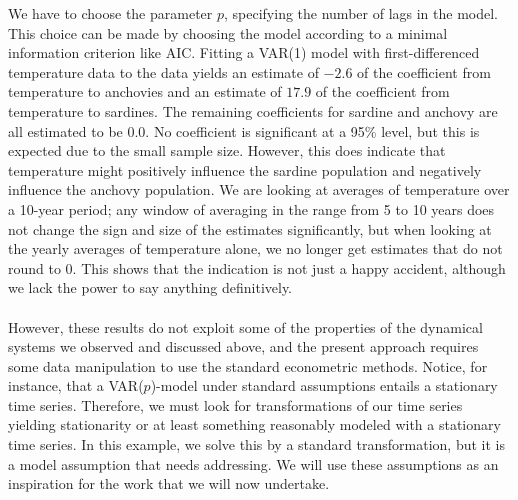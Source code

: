 \documentclass[11pt, a4paper]{memoir}
\theoremstyle{break}
\theoremstyle{break}
\theoremstyle{nonumberplain}
\begin{document}
We have to choose the parameter $p$, specifying the number of lags in the model. This choice can be made by choosing the model according to a minimal information criterion like AIC. Fitting a VAR(1) model with first-differenced temperature data to the data yields an estimate of $-2.6$ of the coefficient from temperature to anchovies and an estimate of $17.9$ of the coefficient from temperature to sardines. The remaining coefficients for sardine and anchovy are all estimated to be $0.0$. No coefficient is significant at a 95\% level, but this is expected due to the small sample size. However, this does indicate that temperature might positively influence the sardine population and negatively influence the anchovy population. We are looking at averages of temperature over a 10-year period; any window of averaging in the range from 5 to 10 years does not change the sign and size of the estimates significantly, but when looking at the yearly averages of temperature alone, we no longer get estimates that do not round to 0. This shows that the indication is not just a happy accident, although we lack the power to say anything definitively.\\\\ 
However, these results do not exploit some of the properties of the dynamical systems we observed and discussed above, and the present approach requires some data manipulation to use the standard econometric methods. Notice, for instance, that a VAR($p$)-model under standard assumptions entails a stationary time series. Therefore, we must look for transformations of our time series yielding stationarity or at least something reasonably modeled with a stationary time series. In this example, we solve this by a standard transformation, but it is a model assumption that needs addressing. We will use these assumptions as an inspiration for the work that we will now undertake.
\end{document}
